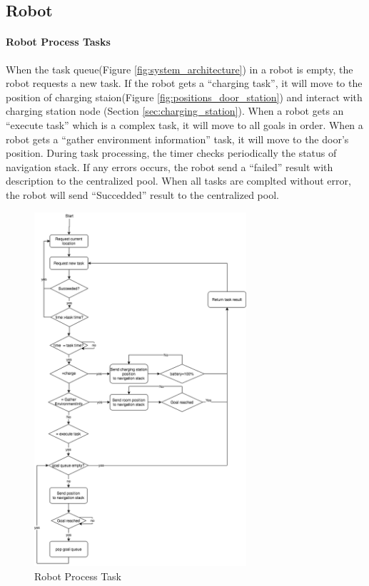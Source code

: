 \subsection{Robot}

\paragraph{Robot Process Tasks}
When the task queue(Figure \ref{fig:system_architecture}) in a robot is empty, the robot requests a new task. If the robot gets a ``charging task'', it will move to the position of charging staion(Figure \ref{fig:positions_door_station}) and interact with charging station node (Section \ref{sec:charging_station}).
When a robot gets an ``execute task'' which is a complex task, it will move to all goals in order.
When a robot gets a ``gather environment information'' task, it will move to the door's position.
During task processing, the timer checks periodically the status of navigation stack. If any errors occurs, the robot send a ``failed'' result with description to the centralized pool.  
When all tasks are complted without error, the robot will send ``Succedded'' result to the centralized pool.


\begin{figure}[htbp]
    \centering
    \includegraphics[width = 0.7\textwidth]{content/images/ch4/robot_process_task.drawio.png}
    \caption{Robot Process Task }
    \label{fig:task_process_robot}
\end{figure}


